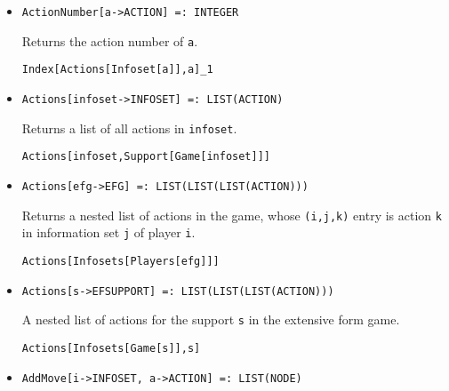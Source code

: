 \begin{itemize}


\item{}
\protect \large \begin{verbatim}
ActionNumber[a->ACTION] =: INTEGER 
\end{verbatim}\normalsize

\bd 
Returns the action number of \verb+a+.
\begin{verbatim}
Index[Actions[Infoset[a]],a]_1
\end{verbatim} 
\ed

\item{}
\protect \large \begin{verbatim}
Actions[infoset->INFOSET] =: LIST(ACTION) 
\end{verbatim}\normalsize

\bd 
Returns a list of all actions in \verb+infoset+.

\begin{verbatim}
Actions[infoset,Support[Game[infoset]]]
\end{verbatim} 
\ed

\item{}
\protect \large \begin{verbatim}
Actions[efg->EFG] =: LIST(LIST(LIST(ACTION))) 
\end{verbatim}\normalsize

\bd 
Returns a nested list of actions in the game, whose  \verb+(i,j,k)+
entry is action \verb+k+ in information set \verb+j+ of player \verb+i+.

\begin{verbatim}
Actions[Infosets[Players[efg]]]
\end{verbatim} 
\ed

\item{}
\protect \large \begin{verbatim}
Actions[s->EFSUPPORT] =: LIST(LIST(LIST(ACTION))) 
\end{verbatim}\normalsize

\bd 

A nested list of actions for the support \verb+s+ in the extensive
form game.

\begin{verbatim}
Actions[Infosets[Game[s]],s]
\end{verbatim} 
\ed

\item{}
\protect \large \begin{verbatim}
AddMove[i->INFOSET, a->ACTION] =: LIST(NODE) 
\end{verbatim}\normalsize


\end{itemize}
